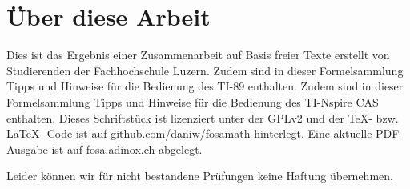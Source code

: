 \chapter*{Über diese Arbeit}
Dies ist das Ergebnis einer Zusammenarbeit auf Basis freier Texte erstellt von Studierenden der Fachhochschule Luzern. 
\ifti
Zudem sind in dieser Formelsammlung Tipps und Hinweise für die Bedienung des TI-89 enthalten. 
\fi
\ifnspire
Zudem sind in dieser Formelsammlung Tipps und Hinweise für die Bedienung des TI-Nspire CAS enthalten. 
\fi
Dieses Schriftstück ist lizenziert unter der GPLv2 und der \TeX-  bzw. \LaTeX- Code ist auf \url{github.com/daniw/fosamath} hinterlegt.
Eine aktuelle PDF-Ausgabe ist auf \url{fosa.adinox.ch} abgelegt. 

Leider können wir für nicht bestandene Prüfungen keine Haftung übernehmen. 